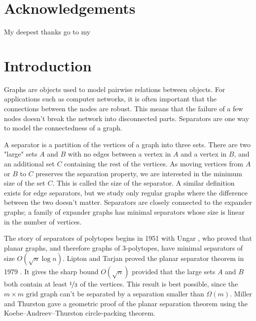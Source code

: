 \documentclass[a4paper,12pt]{book}
\theoremstyle{plain}
\theoremstyle{definition}
\begin{document}
\cleardoublepage




\pagestyle{scrheadings}

\newcommand{\header}[1]{\markboth{}{\MakeUppercase{ #1}}}


\chapter*{Acknowledgements}
\header{Acknowledgements}

My deepest thanks go to my 




\cleardoublepage

\tableofcontents

\cleardoublepage


\chapter{Introduction}
\label{intro}

Graphs are objects used to model pairwise relations between objects. For applications such as computer
networks, it is often important that the connections between the nodes are robust. This means that the failure of a few nodes doesn't 
break the network into disconnected parts. Separators are one way to model the connectedness of a graph. 

A separator is a partition of the vertices of a graph into three sets. There are two "large" sets $A$ and $B$ with no edges
between a vertex in $A$ and a vertex in $B$, and 
an additional set $C$ containing the rest of the vertices. As moving vertices from $A$ or $B$ to
$C$ preserves the separation property, we are interested in the minimum size of the set $C$. 
This is called the size of the separator. A similar definition exists for edge separators, but we study
only regular graphs where the difference between the two doesn't matter.
Separators are closely connected to the expander graphs; a family of expander graphs has minimal separators
whose size is linear in the number of vertices.

The story of separators of polytopes begins in 1951 with Ungar \cite{Ungar1951},
who proved that planar graphs, and therefore graphs of 3-polytopes, have minimal 
separators of size $O(\sqrt{n} \log n)$. Lipton and Tarjan proved the planar 
separator theorem in 1979 \cite{LiTa}. It gives the sharp bound
$O(\sqrt{n})$ provided that the large sets $A$ and $B$ both contain at least $\nicefrac{1}{3}$ of the vertices.
This result is best possible, since the $m\times m$ grid graph
can't be separated by a separation smaller than $\Omega(m)$. Miller and Thurston \cite{MillerThurston-separators} gave a 
geometric proof of the planar separation theorem using the  
Koebe–Andreev–Thurston circle-packing theorem.
\end{document}
